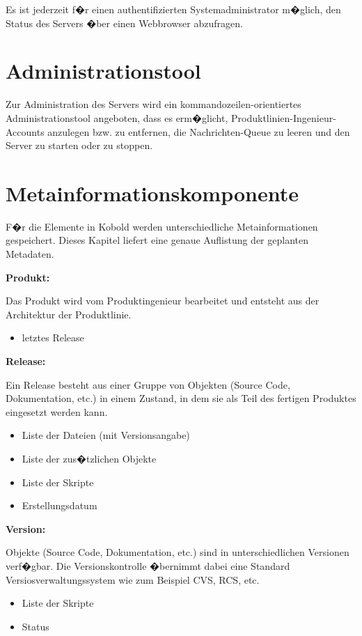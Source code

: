 Es ist jederzeit f�r einen authentifizierten Systemadministrator m�glich,
den Status des Servers �ber einen Webbrowser abzufragen.

\section{Administrationstool}

Zur Administration des Servers wird ein kommandozeilen-orientiertes 
Administrationstool angeboten, dass es erm�glicht, Produktlinien-Ingenieur-Accounts
anzulegen bzw. zu entfernen, die Nachrichten-Queue zu
leeren und den Server zu starten oder zu stoppen.


\section{Metainformationskomponente}

F�r die Elemente in Kobold werden unterschiedliche Metainformationen gespeichert. Dieses Kapitel liefert eine genaue Auflistung der geplanten Metadaten.\newline

\textbf{Produkt:}\par
Das Produkt wird vom Produktingenieur bearbeitet und entsteht aus der Architektur der Produktlinie. 
\begin{itemize}
\item letztes Release\newline
\end{itemize}

\textbf{Release:}\par
Ein Release besteht aus einer Gruppe von Objekten (Source Code, Dokumentation, etc.) in einem Zustand, in dem sie als Teil des fertigen Produktes eingesetzt werden kann.
\begin{itemize}
\item Liste der Dateien (mit Versionsangabe)
\item Liste der zus�tzlichen Objekte
\item Liste der Skripte
\item Erstellungsdatum\newline
\end{itemize}

\textbf{Version:}\par
Objekte (Source Code, Dokumentation, etc.) sind in unterschiedlichen Versionen verf�gbar. Die Versionskontrolle �bernimmt dabei eine Standard Versiosverwaltungssystem wie zum Beispiel CVS, RCS, etc.
\begin{itemize}
\item Liste der Skripte
\item Status\newline
\end{itemize}

